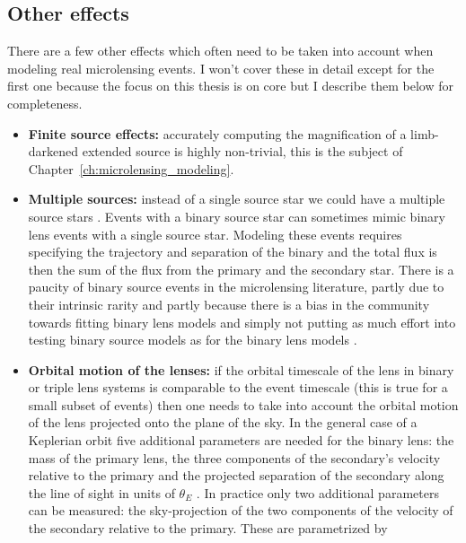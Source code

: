 \documentclass[12pt,dvipsnames]{report}
\begin{document}
\subsection{Other effects}
There are a few other effects which often need to be taken into account when
modeling real microlensing events. I won't cover these in detail except for the
first one because the focus on this thesis is on core but I describe them below
for completeness.
\begin{itemize}
    \item \textbf{Finite source effects:} accurately computing the magnification
          of a limb-darkened extended source is highly non-trivial, this is the subject
          of Chapter~\ref{ch:microlensing_modeling}.
    \item \textbf{Multiple sources:} instead of a single source star we could have
          a multiple source stars \citep{1998A&A...333..893D}.  Events with a binary source
          star can sometimes mimic binary lens events with a single source star.
          Modeling these events requires specifying the trajectory and separation of
          the binary and the total flux is then the sum of the flux from the primary and the
          secondary star.
          There is a paucity of binary source events in the microlensing literature, partly due to
          their intrinsic rarity \citep{1998MNRAS.301..231H} and partly because there is a
          bias in the community towards fitting binary lens models and
          simply not putting as much effort into testing binary source models as
          for the binary lens models \citep{2017AJ....153..129J,2019MNRAS.484.5608D}.
    \item \textbf{Orbital motion of the lenses:} if the orbital timescale of
          the lens in binary or triple lens systems is comparable to the event timescale
          (this is true for a small subset of events) then one needs to take into account
          the orbital motion of the lens projected onto the plane of the sky.
          In the general case of a Keplerian orbit five additional parameters are needed
          for the binary lens: the mass of the primary lens, the three components of the
          secondary's velocity relative to the primary and the projected separation
          of the secondary along the line of sight in units of $\theta_E$
          \citep{1998A&A...329..361D}. In practice only two additional parameters
          can be measured: the sky-projection of the two components of the velocity of
          the secondary relative to the primary. These are parametrized by

\end{itemize}
\end{document}
